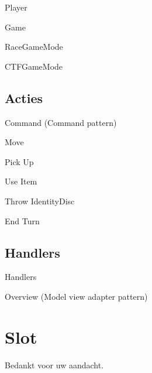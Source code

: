 \documentclass[11pt,t]{beamer}
\begin{document}
\begin{frame}{Player}
\end{frame}

\begin{frame}{Game}
\end{frame}

\begin{frame}{RaceGameMode}
\end{frame}

\begin{frame}{CTFGameMode}
\end{frame}

\subsection{Acties}

\begin{frame}{Command (Command pattern)}
\end{frame}

\begin{frame}{Move}
\end{frame}

\begin{frame}{Pick Up}
\end{frame}

\begin{frame}{Use Item}
\end{frame}

\begin{frame}{Throw IdentityDisc}
\end{frame}

\begin{frame}{End Turn}
\end{frame}

\subsection{Handlers}

\begin{frame}{Handlers}
\end{frame}

\begin{frame}{Overview (Model view adapter pattern)}

\end{frame}
\section{Slot}
\begin{frame}
\vspace{1.5in}
\begin{center}
Bedankt voor uw aandacht.
\end{center}
\end{frame}
\end{document}
